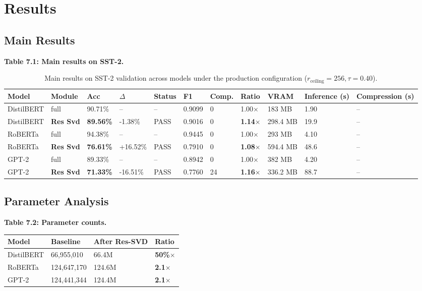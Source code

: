 \section{Results}

\subsection{Main Results}

\textbf{Table 7.1: Main results on SST-2.}

\begin{table}[t]
\centering
\small
\begin{tabular}{lllllllllll}
\toprule
\textbf{Model} & \textbf{Module} & \textbf{Acc} & \textbf{$\Delta$} & \textbf{Status} & \textbf{F1} & \textbf{Comp.} & \textbf{Ratio} & \textbf{VRAM} & \textbf{Inference (s)} & \textbf{Compression (s)} \\
\midrule
DistilBERT & full & 90.71\% & -- & -- & 0.9099 & 0 & 1.00$\times$ & 183 MB & 1.90 & -- \\
DistilBERT & \textbf{Res Svd} & \textbf{89.56\%} & -1.38\% & PASS & 0.9016 & 0 & \textbf{1.14$\times$} & 298.4 MB & 19.9 & -- \\
RoBERTa & full & 94.38\% & -- & -- & 0.9445 & 0 & 1.00$\times$ & 293 MB & 4.10 & -- \\
RoBERTa & \textbf{Res Svd} & \textbf{76.61\%} & +16.52\% & PASS & 0.7910 & 0 & \textbf{1.08$\times$} & 594.4 MB & 48.6 & -- \\
GPT-2 & full & 89.33\% & -- & -- & 0.8942 & 0 & 1.00$\times$ & 382 MB & 4.20 & -- \\
GPT-2 & \textbf{Res Svd} & \textbf{71.33\%} & -16.51\% & PASS & 0.7760 & 24 & \textbf{1.16$\times$} & 336.2 MB & 88.7 & -- \\
\bottomrule
\end{tabular}
\caption{Main results on SST-2 validation across models under the production configuration ($r_{\mathrm{ceiling}}=256, \tau=0.40$).}
\label{tab:main_sst2}
\end{table}

\subsection{Parameter Analysis}

\textbf{Table 7.2: Parameter counts.}

\begin{table}[H]
\centering
\small
\begin{tabular}{llll}
\toprule
\textbf{Model} & \textbf{Baseline} & \textbf{After Res-SVD} & \textbf{Ratio} \\
\midrule
DistilBERT & 66,955,010 & 66.4M & \textbf{50\%$\times$} \\
RoBERTa & 124,647,170 & 124.6M & \textbf{2.1$\times$} \\
GPT-2 & 124,441,344 & 124.4M & \textbf{2.1$\times$} \\
\bottomrule
\end{tabular}
\end{table}

